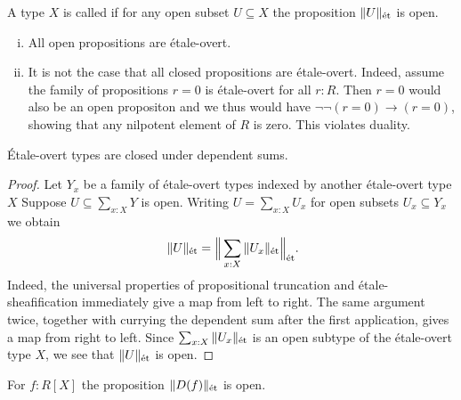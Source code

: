 \begin{definition}
  \label{etale-overt-key-lemma}
  A type \(X\) is called  if for any open subset \(U\subseteq X\)
  the proposition \(\|U\|_\et\) is open.
\end{definition}

\begin{example}
  \begin{enumerate}[i)]
    \item All open propositions are étale-overt.
    \item It is not the case that all closed propositions are étale-overt.
      Indeed, assume the family of propositions $r=0$ is étale-overt for all $r:R$.
      Then $r=0$ would also be an open propositon and we thus would have $\neg\neg(r=0) \to (r=0)$, showing that any nilpotent element of $R$ is zero. This violates duality.
  \end{enumerate}
\end{example}

\begin{lemma}
  \label{étale-overt-is-sigma-closed}
  Étale-overt types are closed under dependent sums.
\end{lemma}

\begin{proof}
  Let $Y_x$ be a family of étale-overt types indexed by another étale-overt type $X$
  Suppose $U \subseteq \sum_{x:X} Y$ is open.
  Writing $U = \sum_{x:X}U_x$ for open subsets $U_x \subseteq Y_x$ we obtain
  \[
    \|U\|_\et = \Big\|\sum_{x:X} \|U_x\|_\et\Big\|_\et\rlap{.}
  \]
  Indeed, the universal properties of propositional truncation and étale-sheafification immediately give a map from left to right. The same argument twice, together with currying the dependent sum after the first application, gives a map from right to left.
  Since $\sum_{x:X} \|U_x\|_\et$ is an open subtype of the étale-overt type $X$, we see that $\|U\|_\et$ is open.
\end{proof}

\begin{lemma}
  \label{R-is-étale-overt-for-standard-opens}
  For \(f:R[X]\) the proposition \(\|D(f)\|_\et\) is open.
\end{lemma}


